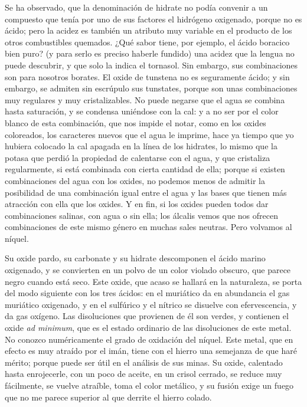 \documentclass[a4paper, 11pt, oneside, polutonikogreek, spanish]{article}
\begin{document}
Se ha observado, que la denominación de hidrate no podía convenir a un compuesto que tenía por uno de sus factores el hidrógeno oxigenado, porque no es ácido; pero la acidez es también un atributo muy variable en el producto de los otros combustibles quemados. ¿Qué sabor tiene, por ejemplo, el ácido boracico bien puro? (y para serlo es preciso haberle fundido) una acidez que la lengua no puede descubrir, y que solo la indica el tornasol. Sin embargo, sus combinaciones son para nosotros borates. El oxide de tunstena no es seguramente ácido; y sin embargo, se admiten sin escrúpulo sus tunstates, porque son unas combinaciones muy regulares y muy cristalizables. No puede negarse que el agua se combina hasta saturación, y se condensa uniéndose con la cal: y a no ser por el color blanco de esta combinación, que nos impide el notar, como en los oxides coloreados, los caracteres nuevos que el agua le imprime, hace ya tiempo que yo hubiera colocado la cal apagada en la línea de los hidrates, lo mismo que la potasa que perdió la propiedad de calentarse con el agua, y que cristaliza regularmente, si está combinada con cierta cantidad de ella; porque si existen combinaciones del agua con los oxides, no podemos menos de admitir la posibilidad de una combinación igual entre el agua y las bases que tienen más atracción con ella que los oxides. Y en fin, si los oxides pueden todos dar combinaciones salinas, con agua o sin ella; los álcalis vemos que nos ofrecen combinaciones de este mismo género en muchas sales neutras. Pero volvamos al níquel.

Su oxide pardo, su carbonate y su hidrate descomponen el ácido marino oxigenado, y se convierten en un polvo de un color violado obscuro, que parece negro cuando está seco. Este oxide, que acaso se hallará en la naturaleza, se porta del modo siguiente con los tres ácidos: en el muriático da en abundancia el gas muriático oxigenado, y en el sulfúrico y el nítrico se disuelve con efervescencia, y da gas oxígeno. Las disoluciones que provienen de él son verdes, y contienen el oxide \emph{ad minimum}, que es el estado ordinario de las disoluciones de este metal. No conozco numéricamente el grado de oxidación del níquel. Este metal, que en efecto es muy atraído por el imán, tiene con el hierro una semejanza de que haré mérito; porque puede ser útil en el análisis de sus minas. Su oxide, calentado hasta enrojecerle, con un poco de aceite, en un crisol cerrado, se reduce muy fácilmente, se vuelve atraíble, toma el color metálico, y su fusión exige un fuego que no me parece superior al que derrite el hierro colado.
\end{document}
